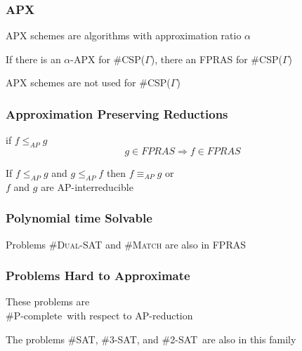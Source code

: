 \documentclass[a4paper,handout]{beamer}
\newcommand{\pname}[1]{\textsc{#1}}
\newcommand{\ccsp}{\#CSP}
\newcommand{\cpc}{\#P-complete}
\newcommand{\csat}{\#SAT}
\newcommand{\ctsat}{\#3-SAT}
\newcommand{\cdsat}{\#2-SAT}
\newcommand{\cisp}{\#IS}
\newcommand{\aple}{\le_{AP}}
\newcommand{\apeq}{\equiv_{AP}}
\theoremstyle{definition}
\begin{document}
\begin{frame}
\frametitle{APX}
APX schemes are algorithms with approximation ratio \(\alpha\) \\
\vskip 12pt
\pause
\begin{theorem}
If there is an \(\alpha\)-APX for \ccsp(\(\Gamma\)), there an FPRAS for \ccsp(\(\Gamma\))
\end{theorem}
\vskip 12pt
APX schemes are not used for \ccsp(\(\Gamma\))
\end{frame}

\begin{frame}
\frametitle{Approximation Preserving Reductions}
\begin{definition}[AP-reduction]
if \(f \aple g\) \\
\[g \in FPRAS \Rightarrow f \in FPRAS\]
\end{definition}

\pause
If \(f \aple g\) and \(g \aple f\) then \(f \apeq g\) or \\
\(f\) and \(g\) are \textcolor{mygreen}{AP-interreducible}
\end{frame}

\begin{frame}
\frametitle{Polynomial time Solvable}
\begin{center}
\end{center}

\pause
Problems \pname{\#Dual-SAT} and \pname{\#Match} are also in FPRAS
\end{frame}

\begin{frame}
\frametitle{Problems Hard to Approximate}
These problems are \\
\cpc\ with respect to AP-reduction \\
\begin{center}
\end{center}
\vskip 12pt
\pause
The problems \csat, \ctsat, and \cdsat\ are also in this family
\end{frame}
\end{document}
